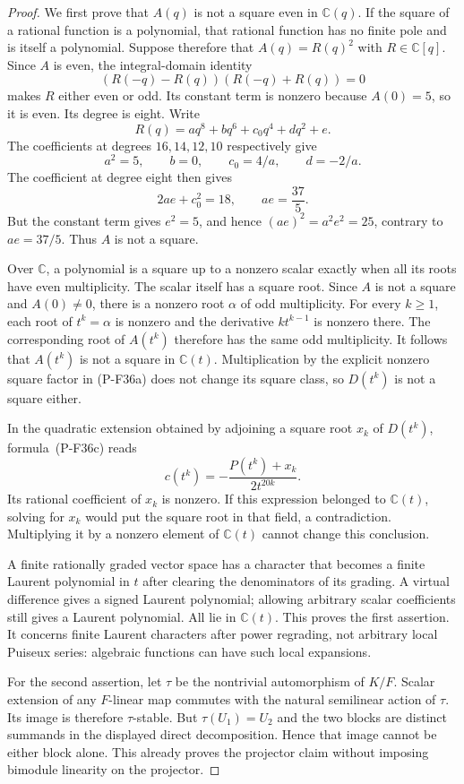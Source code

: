 \documentclass[11pt,a4paper]{article}
\begin{document}
\begin{proof}
We first prove that $A(q)$ is not a square even in $\mathbb C(q)$.
If the square of a rational function is a polynomial, that rational
function has no finite pole and is itself a polynomial. Suppose
therefore that $A(q)=R(q)^2$ with $R\in\mathbb C[q]$.
Since $A$ is even, the integral-domain identity
\[
 (R(-q)-R(q))(R(-q)+R(q))=0
\]
makes $R$ either even or odd. Its constant term is nonzero because
$A(0)=5$, so it is even. Its degree is eight. Write
\[
 R(q)=a q^8+b q^6+c_0 q^4+d q^2+e.
\]
The coefficients at degrees $16,14,12,10$ respectively give
\[
 a^2=5,\qquad b=0,\qquad c_0=4/a,\qquad d=-2/a.
\]
The coefficient at degree eight then gives
\[
 2ae+c_0^2=18,
 \qquad ae=\frac{37}{5}.
\]
But the constant term gives $e^2=5$, and hence
$(ae)^2=a^2e^2=25$, contrary to $ae=37/5$.
Thus $A$ is not a square.

Over $\mathbb C$, a polynomial is a square up to a nonzero scalar
exactly when all its roots have even multiplicity. The scalar
itself has a square root. Since $A$ is not a square and $A(0)\ne0$,
there is a nonzero root $\alpha$ of odd multiplicity. For every
$k\ge1$, each root of $t^k=\alpha$ is nonzero and the derivative
$kt^{k-1}$ is nonzero there. The corresponding root of $A(t^k)$
therefore has the same odd multiplicity. It follows that
$A(t^k)$ is not a square in $\mathbb C(t)$. Multiplication by the
explicit nonzero square factor in (P-F36a) does not change its
square class, so $D(t^k)$ is not a square either.

In the quadratic extension obtained by adjoining a square root
$x_k$ of $D(t^k)$, formula~(P-F36c) reads
\[
 c(t^k)=-\frac{P(t^k)+x_k}{2t^{20k}}.
\]
Its rational coefficient of $x_k$ is nonzero. If this expression
belonged to $\mathbb C(t)$, solving for $x_k$ would put the
square root in that field, a contradiction. Multiplying it by
a nonzero element of $\mathbb C(t)$ cannot change this conclusion.

A finite rationally graded vector space has a character that
becomes a finite Laurent polynomial in $t$ after clearing the
denominators of its grading. A virtual difference gives a signed
Laurent polynomial; allowing arbitrary scalar coefficients still
gives a Laurent polynomial. All lie in $\mathbb C(t)$.
This proves the first assertion. It concerns finite Laurent
characters after power regrading, not arbitrary local Puiseux
series: algebraic functions can have such local expansions.

For the second assertion, let $\tau$ be the nontrivial automorphism
of $K/F$. Scalar extension of any $F$-linear map commutes with
the natural semilinear action of $\tau$. Its image is therefore
$\tau$-stable. But $\tau(U_1)=U_2$ and the two blocks are distinct
summands in the displayed direct decomposition. Hence that image
cannot be either block alone. This already proves the projector
claim without imposing bimodule linearity on the projector.


\end{proof}
\end{document}
